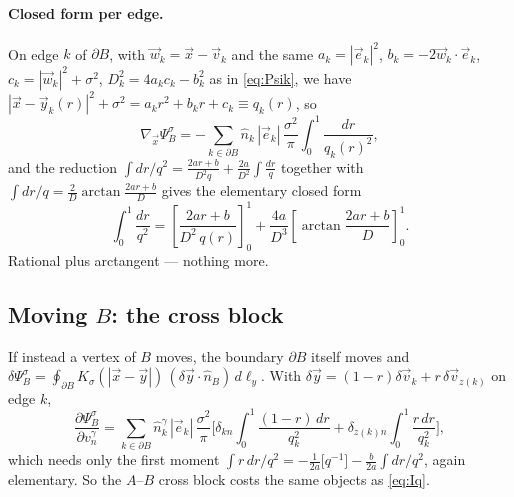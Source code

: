 \documentclass[11pt]{article}
\numberwithin{equation}{section}
\newcommand{\vv}[1]{\vec{#1}}
\begin{document}
\paragraph{Closed form per edge.} On edge $k$ of $\partial B$, with $\vv w_k=\vv x-\vv v_k$ and the same
$a_k=|\vv e_k|^2$, $b_k=-2\vv w_k\!\cdot\!\vv e_k$, $c_k=|\vv w_k|^2+\sigma^2$, $D_k^2=4a_kc_k-b_k^2$ as
in \eqref{eq:Psik}, we have $|\vv x-\vv y_k(r)|^2+\sigma^2=a_kr^2+b_kr+c_k\equiv q_k(r)$, so
\begin{equation}\label{eq:gradPsiedge}
  \nabla_{\!\vv x}\Psi_B^\sigma=-\sum_{k\in\partial B}\hat n_k\,|\vv e_k|\,\frac{\sigma^2}{\pi}
  \int_0^1\frac{dr}{q_k(r)^2},
\end{equation}
and the reduction $\int dr/q^2=\frac{2ar+b}{D^2q}+\frac{2a}{D^2}\int\frac{dr}{q}$ together with
$\int dr/q=\frac2D\arctan\frac{2ar+b}{D}$ gives the elementary closed form
\begin{equation}\label{eq:Iq}
  \int_0^1\frac{dr}{q^2}=\left[\frac{2ar+b}{D^2\,q(r)}\right]_0^1
  +\frac{4a}{D^3}\left[\arctan\frac{2ar+b}{D}\right]_0^1 .
\end{equation}
Rational plus arctangent --- nothing more.

\subsection{Moving \texorpdfstring{$B$}{B}: the cross block}
If instead a vertex of $B$ moves, the boundary $\partial B$ itself moves and
$\delta\Psi_B^\sigma=\oint_{\partial B}K_\sigma(|\vv x-\vv y|)\,(\delta\vv y\!\cdot\!\hat n_B)\,d\ell_y$.
With $\delta\vv y=(1-r)\delta\vv v_k+r\,\delta\vv v_{z(k)}$ on edge $k$,
\begin{equation}\label{eq:PsiBvert}
  \frac{\partial\Psi_B^\sigma}{\partial v_n^\gamma}
  =\sum_{k\in\partial B}\hat n_k^\gamma\,|\vv e_k|\,\frac{\sigma^2}{\pi}
  \Big[\delta_{kn}\!\int_0^1\!\frac{(1-r)\,dr}{q_k^2}+\delta_{z(k)n}\!\int_0^1\!\frac{r\,dr}{q_k^2}\Big],
\end{equation}
which needs only the first moment $\int r\,dr/q^2=-\frac1{2a}\big[q^{-1}\big]-\frac{b}{2a}\int dr/q^2$,
again elementary. So the $A$--$B$ cross block costs the same objects as \eqref{eq:Iq}.
\end{document}
